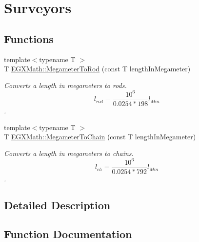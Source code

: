 \hypertarget{group___e_g_x_math-_conversions-_length_conversions-_megameter-_surveyors}{}\section{Surveyors}
\label{group___e_g_x_math-_conversions-_length_conversions-_megameter-_surveyors}
\subsection*{Functions}
\begin{DoxyCompactItemize}
\item 
{\footnotesize template$<$typename T $>$ }\\T \mbox{\hyperlink{group___e_g_x_math-_conversions-_length_conversions-_megameter-_surveyors_ga46cf50c3f1310663facf0befbf3d71fb}{E\+G\+X\+Math\+::\+Megameter\+To\+Rod}} (const T length\+In\+Megameter)
\begin{DoxyCompactList}\small\item\em Converts a length in megameters to rods. \[ l_{rod}= \frac{10^{6}}{0.0254 * 198} l_{Mm} \]. \end{DoxyCompactList}\item 
{\footnotesize template$<$typename T $>$ }\\T \mbox{\hyperlink{group___e_g_x_math-_conversions-_length_conversions-_megameter-_surveyors_ga7328b29fbeec6b35bf3b74f58d8bdfc0}{E\+G\+X\+Math\+::\+Megameter\+To\+Chain}} (const T length\+In\+Megameter)
\begin{DoxyCompactList}\small\item\em Converts a length in megameters to chains. \[ l_{ch}= \frac{10^{6}}{0.0254 * 792} l_{Mm} \]. \end{DoxyCompactList}\end{DoxyCompactItemize}


\subsection{Detailed Description}


\subsection{Function Documentation}
\mbox{\label{group___e_g_x_math-_conversions-_length_conversions-_megameter-_surveyors_ga7328b29fbeec6b35bf3b74f58d8bdfc0}} 
